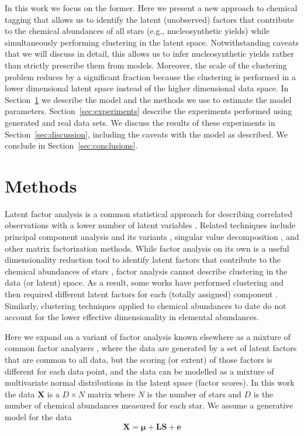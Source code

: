 \documentclass[twocolumn]{aastex62}
\newcommand{\vect}[1]{\boldsymbol{\mathbf{#1}}}
\renewcommand{\vec}[1]{\vect{#1}}
\newcommand{\vecdataunscaled}{\vec{X}}
\newcommand{\factorloads}{\textbf{L}}
\newcommand{\factorscores}{\textbf{S}}
\newcommand{\NumData}{N}
\newcommand{\NumDimensions}{D}
\begin{document}
In this work we focus on the former.
Here we present a new approach to chemical tagging that allows us to identify 
the latent (unobserved) factors that contribute to the chemical abundances of 
all stars (e.g., nucleosynthetic yields) while simultaneously performing 
clustering in the latent space. Notwithstanding caveats that we will
discuss in detail, this allows us to infer nucleosynthetic yields rather than
strictly prescribe them from models. Moreover, the scale of the clustering
problem reduces by a significant fraction because the clustering is performed in
a lower dimensional latent space instead of the higher dimensional data space.
In Section~\ref{sec:methods} we describe the model and the methods we use to
estimate the model parameters. Section~\ref{sec:experiments} describe the 
experiments performed using generated and real data sets. We discuss the results
of these experiments in Section~\ref{sec:discussion}, including the caveats with
the model as described. We conclude in Section~\ref{sec:conclusions}.



\section{Methods} \label{sec:methods}

Latent factor analysis is a common statistical approach for describing correlated 
observations with a lower number of latent variables \citep[e.g.,][]{Thompson:2004}.
Related techniques include principal component analysis \citep{Hotelling:1933} and its
variants \citep{Tipping;Bishop:1999}, singular value decomposition \citep{Golub:1970}, and other
matrix factorization methods. While factor analysis on its own is a useful
dimensionality reduction tool to identify latent factors that contribute to
the chemical abundances of stars \citep[e.g.,][]{Ting:2012,Price-Jones:2018}, factor
analysis cannot describe clustering in the data (or latent) space. As a result,
some works have performed clustering and then required different latent factors for each (totally assigned) component \citep[e.g.,][]{EdwardsDowe1998}.
Similarly, clustering techniques applied to chemical abundances to date 
\citep[e.g.,][]{Hogg:2016} do not account for the lower effective dimensionality in
elemental abundances.

Here we expand on a variant of factor analysis known elsewhere as a mixture of common 
factor analyzers \citep{Baek:2010}, where the data are generated by a set of 
latent factors that are common to all data, but the scoring (or extent) of those
factors is different for each data point, and the data can be modelled as a
mixture of multivariate normal distributions in the latent space (factor scores).
In this work the data $\vecdataunscaled$ is a 
$\NumDimensions \times \NumData$ matrix where $\NumData$ is the number of 
stars and $\NumDimensions$ is the number of chemical abundances measured 
for each star. We assume a generative model for the data 
\begin{equation}
	\vecdataunscaled = \vec\mu + \factorloads\factorscores + \vec{e}
	\label{eq:generative-model}
\end{equation}
\end{document}
